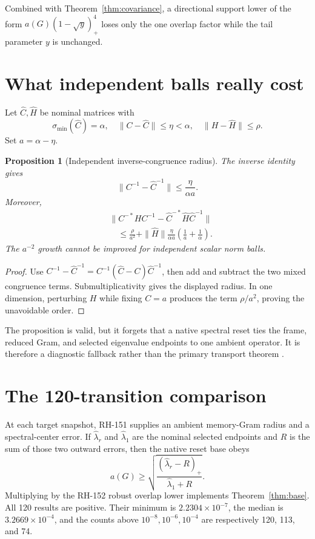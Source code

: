\documentclass[12pt]{article}
\newtheorem{proposition}[theorem]{Proposition}
\begin{document}
Combined with Theorem~\ref{thm:covariance}, a directional support lower of
the form $a(G)(1-\sqrt y)_+^4$ loses only the one overlap factor while the
tail parameter $y$ is unchanged.

\section{What independent balls really cost}
Let $\widehat C,\widehat H$ be nominal matrices with
\[
 \sigma_{\min}(\widehat C)=\alpha,\quad
 \|C-\widehat C\|\leq\eta<\alpha,\quad
 \|H-\widehat H\|\leq\rho.
\]
Set $a=\alpha-\eta$.

\begin{proposition}[Independent inverse-congruence radius]\label{prop:radius}
The inverse identity gives
\[
 \|C^{-1}-\widehat C^{-1}\|\leq\frac{\eta}{\alpha a}.
\]
Moreover,
\begin{align*}
 &\|C^{-*}HC^{-1}-\widehat C^{-*}\widehat H\widehat C^{-1}\|\\
 &\quad\leq
 \frac{\rho}{a^2}
 +\|\widehat H\|\frac{\eta}{\alpha a}
 \left(\frac1a+\frac1\alpha\right).
\end{align*}
The $a^{-2}$ growth cannot be improved for independent scalar norm balls.
\end{proposition}
\begin{proof}
Use $C^{-1}-\widehat C^{-1}=C^{-1}(\widehat C-C)\widehat C^{-1}$,
then add and subtract the two mixed congruence terms.  Submultiplicativity
gives the displayed radius.  In one dimension, perturbing $H$ while fixing
$C=a$ produces the term $\rho/a^2$, proving the unavoidable order.
\end{proof}

The proposition is valid, but it forgets that a native spectral reset ties
the frame, reduced Gram, and selected eigenvalue endpoints to one ambient
operator.  It is therefore a diagnostic fallback rather than the primary
transport theorem \citep{StewartSun1990,Bhatia1997}.

\section{The 120-transition comparison}
At each target snapshot, RH-151 supplies an ambient memory-Gram radius and a
spectral-center error.  If $\widehat\lambda_r$ and
$\widehat\lambda_1$ are the nominal selected endpoints and $R$ is the sum of
those two outward errors, then the native reset base obeys
\[
 a(G)\geq
 \sqrt{\frac{(\widehat\lambda_r-R)_+}
 {\widehat\lambda_1+R}}.
\]
Multiplying by the RH-152 robust overlap lower implements
Theorem~\ref{thm:base}.  All 120 results are positive.  Their minimum is
$2.2304\times10^{-7}$, the median is $3.2669\times10^{-4}$, and the counts
above $10^{-8},10^{-6},10^{-4}$ are respectively 120, 113, and 74.
\end{document}
